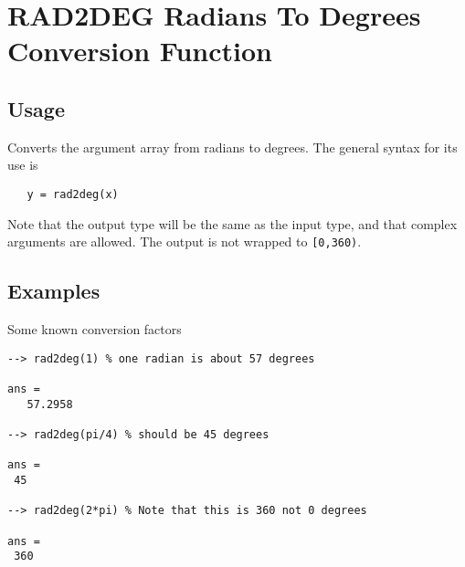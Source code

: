 \section{RAD2DEG Radians To Degrees Conversion Function}

\subsection{Usage}

Converts the argument array from radians to degrees.  The general
syntax for its use is
\begin{verbatim}
   y = rad2deg(x)
\end{verbatim}
Note that the output type will be the same as the input type, and that
complex arguments are allowed.  The output is not wrapped to \verb|[0,360)|.
\subsection{Examples}

Some known conversion factors
\begin{verbatim}
--> rad2deg(1) % one radian is about 57 degrees

ans = 
   57.2958 

--> rad2deg(pi/4) % should be 45 degrees

ans = 
 45 

--> rad2deg(2*pi) % Note that this is 360 not 0 degrees

ans = 
 360 
\end{verbatim}
